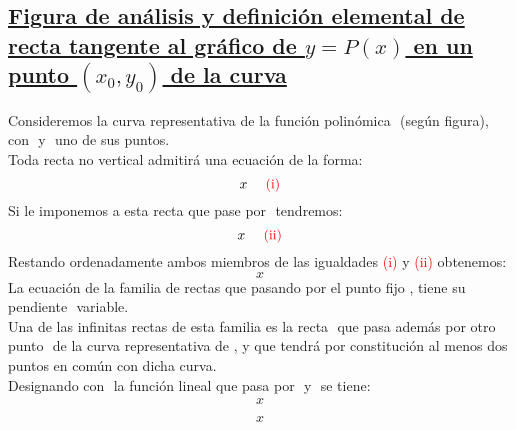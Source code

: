 \documentclass[12pt]{article}
\begin{document}
\subsection{
  \ul{Figura de análisis y definición elemental de recta tangente al gráfico de $y=P(x)$ en un punto $({x}_0,{y}_0)$ de la curva}
}

\begin{center}
\end{center}

Consideremos la curva representativa de la función polinómica $ $ (según figura), con $ $ y $ $ uno de sus puntos.\\
Toda recta no vertical admitirá una ecuación de la forma:
$$
  x \ \ \ \ \text{\textcolor{red}{(i)}}
$$
Si le imponemos a esta recta que pase por $ $ tendremos:
$$
  x \ \ \ \ \text{\textcolor{red}{(ii)}}
$$
Restando ordenadamente ambos miembros de las igualdades \textcolor{red}{(i)} y \textcolor{red}{(ii)} obtenemos:
$$
  x
$$
La ecuación de la familia de rectas que pasando por el punto fijo $ $, tiene su pendiente $ $ variable.\\
Una de las infinitas rectas de esta familia es la recta $ $ que pasa además por otro punto $ $ de la curva representativa de $ $, y que tendrá por constitución al menos dos puntos en común con dicha curva.\\
Designando con $ $ la función lineal que pasa por $ $ y $ $ se tiene:
$$
  \begin{array}{ccc}
    x \\
    \\
    x
  \end{array}
$$
\end{document}
